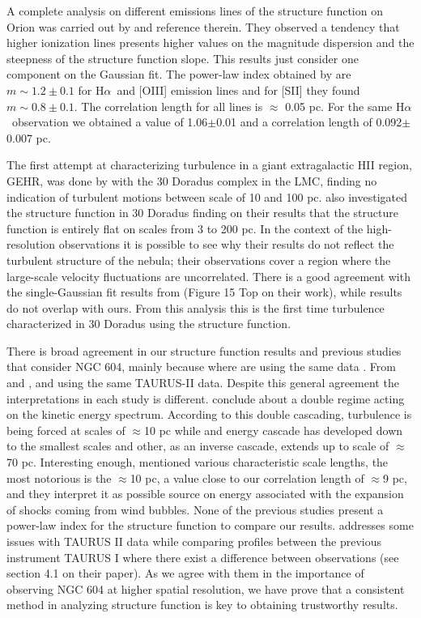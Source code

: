 \documentclass[fleqn,usenatbib, useAMS, a4paper]{mnras}
\newcommand\halpha{H${\alpha}$}
\begin{document}
A complete analysis on different emissions lines of the structure function on Orion was carried out by \citet{arthur2016turbulence} and reference therein. 
They observed a tendency that higher ionization lines presents higher values on the magnitude dispersion and the steepness of the structure function slope. 
This results just consider one component on the Gaussian fit. 
The power-law index obtained by \citet{arthur2016turbulence} are \(m \sim 1.2 \pm 0.1\) for \halpha\ and [OIII] emission lines and for [SII] they found \(m \sim 0.8 \pm 0.1\). 
The correlation length for all lines is \(\approx\) 0.05 pc. For the same \halpha\ observation we obtained a value of 1.06$\pm$0.01 and a correlation length of 0.092$\pm$0.007 pc. 

The first attempt at characterizing turbulence in a giant extragalactic HII region, GEHR, was done by \citet{1961MNRAS.122....1F} with the 30 Doradus complex in the LMC, finding no indication of turbulent motions between scale of 10 and 100 pc.
\citet{Melnick:2021x} also investigated the structure function in 30 Doradus finding on their results that the structure function is entirely flat on scales from 3 to 200 pc.
In the context of the high-resolution observations it is possible to see why their results do not reflect the turbulent structure of the nebula; their observations cover a region where the large-scale velocity fluctuations are uncorrelated.
There is a good agreement with the single-Gaussian fit results from \citet{2019arXiv191203543M} (Figure 15 Top on their work), while \citet{1961MNRAS.122....1F} results do not overlap with ours.
From this analysis this is the first time turbulence characterized in 30 Doradus using the structure function.

There is broad agreement in our structure function results and previous studies that consider NGC 604, mainly because where are using the same data \citep{Medina-Tanco:1997a, Melnick:2021x}.
From \citet{Medina-Tanco:1997a} and \citet{Melnick:2021x}, and using the same TAURUS-II data.
Despite this general agreement the interpretations in each study is different.
\citet{Medina-Tanco:1997a} conclude about a double regime acting on the kinetic energy spectrum.
According to this double cascading, turbulence is being forced at scales of \(\approx\)10 pc while and energy cascade has developed down to the smallest scales and other, as an inverse cascade, extends up to scale of \(\approx\)70 pc.
Interesting enough, \citet{Medina-Tanco:1997a} mentioned various characteristic scale lengths, the most notorious is the \(\approx\)10 pc, a value close to our correlation length of \(\approx\)9 pc, and they interpret it as possible source on energy associated with the expansion of shocks coming from wind bubbles.  
None of the previous studies present a power-law index for the structure function to compare our results.
\citet{Melnick:2021x} addresses some issues with TAURUS II data while comparing profiles between the previous instrument TAURUS I where there exist a difference between observations (see section 4.1 on their paper).
As we agree with them in the importance of observing NGC 604 at higher spatial resolution, we have prove that a consistent method in analyzing structure function is key to obtaining trustworthy results.
\end{document}
